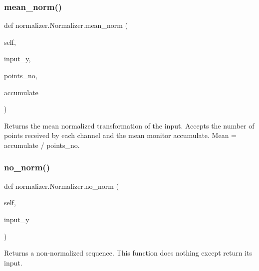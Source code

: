 \mbox{\label{classnormalizer_1_1Normalizer_ac9530ba0efaa543756ecfef0e871b63e}} 
\subsubsection{\texorpdfstring{mean\+\_\+norm()}{mean\_norm()}}
{\footnotesize\ttfamily def normalizer.\+Normalizer.\+mean\+\_\+norm (\begin{DoxyParamCaption}\item[{}]{self,  }\item[{}]{input\+\_\+y,  }\item[{}]{points\+\_\+no,  }\item[{}]{accumulate }\end{DoxyParamCaption})}

\begin{DoxyVerb}Returns the mean normalized transformation of the input. Accepts the number of points received by each 
channel and the mean monitor accumulate. Mean = accumulate / points_no.
\end{DoxyVerb}
 \mbox{\label{classnormalizer_1_1Normalizer_a7965c29d7d3a867dbb82cc7f3e7e69b3}} 
\subsubsection{\texorpdfstring{no\+\_\+norm()}{no\_norm()}}
{\footnotesize\ttfamily def normalizer.\+Normalizer.\+no\+\_\+norm (\begin{DoxyParamCaption}\item[{}]{self,  }\item[{}]{input\+\_\+y }\end{DoxyParamCaption})}

\begin{DoxyVerb}Returns a non-normalized sequence. This function does nothing except return its input.
\end{DoxyVerb}
 \mbox{\label{classnormalizer_1_1Normalizer_acae7ff724a12ef29c97f6eb2d30f5d62}} 
